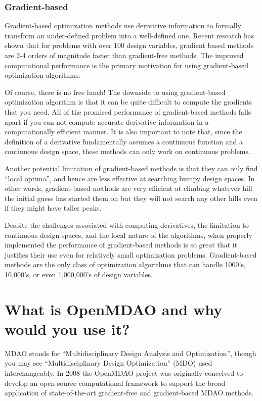 \documentclass[conf]{new-aiaa}
\begin{document}
        \subsubsection{Gradient-based}

            Gradient-based optimization methods use derivative information to formally transform an under-defined problem into a well-defined one.  
            Recent research has shown that for problems with over 100 design variables, gradient based methods are 2-4 orders of magnitude faster than gradient-free methods. 
            The improved computational performance is the primary motivation for using gradient-based optimization algorithms. 
            
            Of course, there is no free lunch! The downside to using gradient-based optimization algorithm is that it can be quite difficult to compute the gradients that you need. 
            All of the promised performance of gradient-based methods falls apart if you can not compute accurate derivative information in a computationally efficient manner. 
            It is also important to note that, since the definition of a derivative fundamentally assumes a continuous function and a continuous design space, these methods can only work on continuous problems. 

            Another potential limitation of gradient-based methods is that they can only find ``local optima'', and hence are less effective at searching bumpy design spaces. 
            In other words, gradient-based methods are very efficient at climbing whatever hill the initial guess has started them on but they will not search any other hills even if they might have taller peaks. 

            Despite the challenges associated with computing derivatives, the limitation to continuous design spaces, and the local nature of the algorithms, when properly implemented the performance of gradient-based methods is so great that it justifies their use even for relatively small optimization problems. 
            Gradient-based methods are the only class of optimization algorithms that can handle 1000's, 10,000's, or even 1,000,000's of design variables. 

\section{What is OpenMDAO and why would you use it?}

    MDAO stands for ``Multidisciplinary Design Analysis and Optimization'', though you may see ``Multidisciplinary Design Optimization'' (MDO) used interchangeably. 
    In 2008 the OpenMDAO project was originally conceived to develop an open-source computational framework to support the broad application of state-of-the-art gradient-free and gradient-based MDAO methods. 
\end{document}
